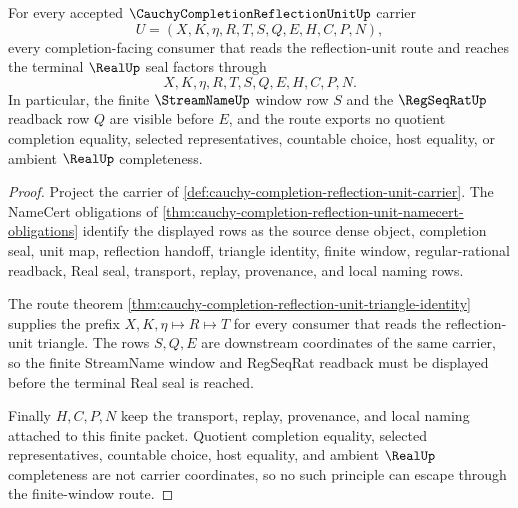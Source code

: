 \begin{theorem}
\label{thm:cauchy-completion-reflection-unit-finite-window-nonescape}
For every accepted $\CauchyCompletionReflectionUnitUp$ carrier
$$
U=(X,K,\eta,R,T,S,Q,E,H,C,P,N),
$$
every completion-facing consumer that reads the reflection-unit route and reaches the terminal $\RealUp$ seal factors through
$$
X,K,\eta,R,T,S,Q,E,H,C,P,N .
$$
In particular, the finite $\StreamNameUp$ window row $S$ and the $\RegSeqRatUp$ readback row $Q$ are visible before $E$, and the route exports no quotient completion equality, selected representatives, countable choice, host equality, or ambient $\RealUp$ completeness.
\end{theorem}
\begin{proof}
Project the carrier of \autoref{def:cauchy-completion-reflection-unit-carrier}. The NameCert obligations of \autoref{thm:cauchy-completion-reflection-unit-namecert-obligations} identify the displayed rows as the source dense object, completion seal, unit map, reflection handoff, triangle identity, finite window, regular-rational readback, Real seal, transport, replay, provenance, and local naming rows.

The route theorem \autoref{thm:cauchy-completion-reflection-unit-triangle-identity} supplies the prefix $X,K,\eta \longmapsto R \longmapsto T$ for every consumer that reads the reflection-unit triangle. The rows $S,Q,E$ are downstream coordinates of the same carrier, so the finite StreamName window and RegSeqRat readback must be displayed before the terminal Real seal is reached.

Finally $H,C,P,N$ keep the transport, replay, provenance, and local naming attached to this finite packet. Quotient completion equality, selected representatives, countable choice, host equality, and ambient $\RealUp$ completeness are not carrier coordinates, so no such principle can escape through the finite-window route.
\end{proof}


